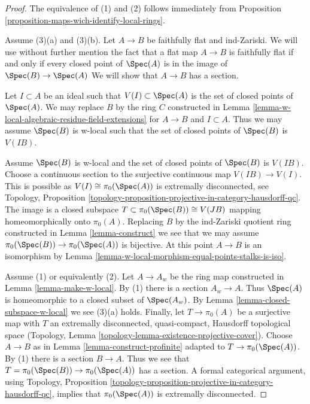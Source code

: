 \begin{proof}
The equivalence of (1) and (2) follows immediately from
Proposition \ref{proposition-maps-wich-identify-local-rings}.

\medskip\noindent
Assume (3)(a) and (3)(b). Let $A \to B$ be faithfully flat and ind-Zariski.
We will use without further mention the fact that a flat map
$A \to B$ is faithfully flat if and only if every closed point
of $\Spec(A)$ is in the image of $\Spec(B) \to \Spec(A)$
We will show that $A \to B$ has a section.

\medskip\noindent
Let $I \subset A$ be an ideal such that $V(I) \subset \Spec(A)$ is
the set of closed points of $\Spec(A)$. 
We may replace $B$ by the ring $C$ constructed in
Lemma \ref{lemma-w-local-algebraic-residue-field-extensions}
for $A \to B$ and $I \subset A$.
Thus we may assume $\Spec(B)$ is w-local such that the set of
closed points of $\Spec(B)$ is $V(IB)$.

\medskip\noindent
Assume $\Spec(B)$ is w-local and the set of closed points of $\Spec(B)$
is $V(IB)$. Choose a continuous section to the surjective
continuous map $V(IB) \to V(I)$. This is possible as
$V(I) \cong \pi_0(\Spec(A))$ is extremally disconnected, see
Topology, Proposition
\ref{topology-proposition-projective-in-category-hausdorff-qc}.
The image is a closed subspace $T \subset \pi_0(\Spec(B)) \cong V(JB)$
mapping homeomorphically onto $\pi_0(A)$. Replacing $B$ by the ind-Zariski
quotient ring constructed in Lemma \ref{lemma-construct}
we see that we may assume $\pi_0(\Spec(B)) \to \pi_0(\Spec(A))$
is bijective. At this point $A \to B$ is an isomorphism by
Lemma \ref{lemma-w-local-morphism-equal-points-stalks-is-iso}.

\medskip\noindent
Assume (1) or equivalently (2). Let $A \to A_w$ be the ring map constructed in
Lemma \ref{lemma-make-w-local}. By (1) there is a section $A_w \to A$.
Thus $\Spec(A)$ is homeomorphic to a closed subset of $\Spec(A_w)$. By
Lemma \ref{lemma-closed-subspace-w-local} we see (3)(a) holds.
Finally, let $T \to \pi_0(A)$ be a surjective map with $T$ an
extremally disconnected, quasi-compact, Hausdorff topological space
(Topology, Lemma \ref{topology-lemma-existence-projective-cover}).
Choose $A \to B$ as in Lemma \ref{lemma-construct-profinite}
adapted to $T \to \pi_0(\Spec(A))$. By (1) there is a section
$B \to A$. Thus we see that $T = \pi_0(\Spec(B)) \to \pi_0(\Spec(A))$
has a section. A formal categorical argument, using
Topology, Proposition
\ref{topology-proposition-projective-in-category-hausdorff-qc},
implies that $\pi_0(\Spec(A))$ is extremally disconnected.
\end{proof}

